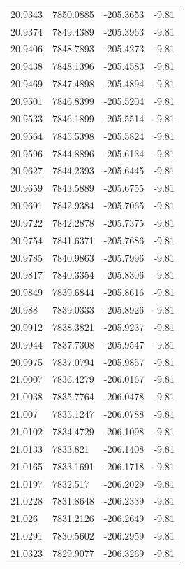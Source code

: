 \begin{table}[H]
\begin{tabular}{llll}
20.9343 & 7850.0885 & -205.3653 & -9.81 \\
20.9374 & 7849.4389 & -205.3963 & -9.81 \\
20.9406 & 7848.7893 & -205.4273 & -9.81 \\
20.9438 & 7848.1396 & -205.4583 & -9.81 \\
20.9469 & 7847.4898 & -205.4894 & -9.81 \\
20.9501 & 7846.8399 & -205.5204 & -9.81 \\
20.9533 & 7846.1899 & -205.5514 & -9.81 \\
20.9564 & 7845.5398 & -205.5824 & -9.81 \\
20.9596 & 7844.8896 & -205.6134 & -9.81 \\
20.9627 & 7844.2393 & -205.6445 & -9.81 \\
20.9659 & 7843.5889 & -205.6755 & -9.81 \\
20.9691 & 7842.9384 & -205.7065 & -9.81 \\
20.9722 & 7842.2878 & -205.7375 & -9.81 \\
20.9754 & 7841.6371 & -205.7686 & -9.81 \\
20.9785 & 7840.9863 & -205.7996 & -9.81 \\
20.9817 & 7840.3354 & -205.8306 & -9.81 \\
20.9849 & 7839.6844 & -205.8616 & -9.81 \\
20.988 & 7839.0333 & -205.8926 & -9.81 \\
20.9912 & 7838.3821 & -205.9237 & -9.81 \\
20.9944 & 7837.7308 & -205.9547 & -9.81 \\
20.9975 & 7837.0794 & -205.9857 & -9.81 \\
21.0007 & 7836.4279 & -206.0167 & -9.81 \\
21.0038 & 7835.7764 & -206.0478 & -9.81 \\
21.007 & 7835.1247 & -206.0788 & -9.81 \\
21.0102 & 7834.4729 & -206.1098 & -9.81 \\
21.0133 & 7833.821 & -206.1408 & -9.81 \\
21.0165 & 7833.1691 & -206.1718 & -9.81 \\
21.0197 & 7832.517 & -206.2029 & -9.81 \\
21.0228 & 7831.8648 & -206.2339 & -9.81 \\
21.026 & 7831.2126 & -206.2649 & -9.81 \\
21.0291 & 7830.5602 & -206.2959 & -9.81 \\
21.0323 & 7829.9077 & -206.3269 & -9.81 \\

\end{tabular}
\end{table}

